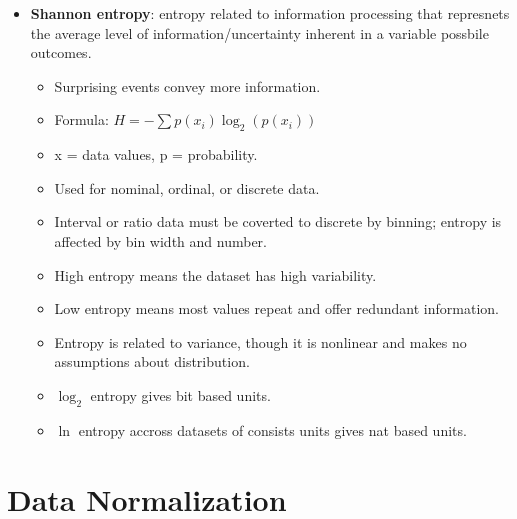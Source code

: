\documentclass[12pt,a4paper]{article}
\begin{document}
\begin{itemize}
    \item \textbf{Shannon entropy}: entropy related to information processing that represnets the average level of information/uncertainty inherent in a variable possbile outcomes.
        \begin{itemize}
            \item Surprising events convey more information.
            \item Formula: {\color{o-Sun}\(H = -\sum p(x_i)\log_2(p(x_i))\)}
            \item x = data values, p = probability.
            \item Used for nominal, ordinal, or discrete data.
            \item Interval or ratio data must be coverted to discrete by binning; entropy is affected by bin width and number.
            \item {\color{pos}High entropy} means the dataset has {\color{pos}high variability}.
            \item {\color{neg}Low entropy} means most values repeat and offer {\color{neg}redundant} information.
            \item Entropy is related to variance, though it is 
            {\color{o-Sun}nonlinear} and makes {\color{o-Sun}no assumptions} about distribution.
            \item \(\log_2\) entropy gives {\color{o-Sun}bit} based units.
            \item \(\ln\) entropy accross datasets of consists units gives {\color{o-Sun}nat} based units.
        \end{itemize}
\end{itemize}



\clearpage
\section{Data Normalization}
\end{document}
